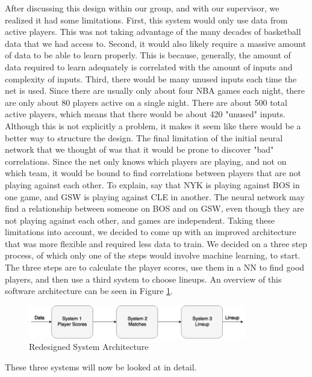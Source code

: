 After discussing this design within our group, and with our supervisor, we realized it had some limitations. First, this system would only use data from active players. This was not taking advantage of the many decades of basketball data that we had access to. Second, it would also likely require a massive amount of data to be able to learn properly. This is because, generally, the amount of data required to learn adequately is correlated with the amount of inputs and complexity of inputs. Third, there would be many unused inputs each time the net is used. Since there are usually only about four NBA games each night, there are only about 80 players active on a single night. There are about 500 total active players, which means that there would be about 420 "unused" inputs. Although this is not explicitly a problem, it makes it seem like there would be a better way to structure the design. The final limitation of the initial neural network that we thought of was that it would be prone to discover "bad" correlations. 
Since the net only knows which players are playing, and not on which team, it would be bound to find correlations between players that are not playing against each other. To explain, say that NYK is playing against BOS in one game, and GSW is playing against CLE in another. The neural network may find a relationship between someone on BOS and on GSW, even though they are not playing against each other, and games are independent.
Taking these limitations into account, we decided to come up with an improved architecture that was more flexible and required less data to train. We decided on a three step process, of which only one of the steps would involve machine learning, to start. The three steps are to calculate the player scores, use them in a NN to find good players, and then use a third system to choose lineups. An overview of this software architecture can be seen in Figure \ref{fig:second_iteration}.
\begin{figure}[ht]
    \centering
    \includegraphics[width=0.85\textwidth]{figures/second_iteration}
    \caption{Redesigned System Architecture}
    \label{fig:second_iteration}
\end{figure}

These three systems will now be looked at in detail.

